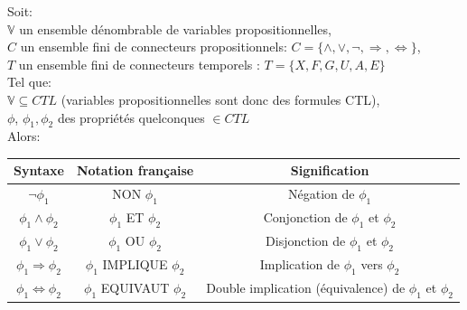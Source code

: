 \documentclass[runningheads,a4paper,10pt]{llncs}
\begin{document}
Soit: \\
$\mathbb{V}$ un ensemble dénombrable de variables propositionnelles, \\
$C$ un ensemble fini de connecteurs propositionnels: $C = \{\wedge, \vee, \neg, \Rightarrow, \Leftrightarrow \}$, \\
$T$ un ensemble fini de connecteurs temporels : $T = \{X, F, G, U, A, E\}$ \\

Tel que:\\
$\mathbb{V} \subseteq CTL$ (variables propositionnelles sont donc des formules CTL), \\
$\phi$, $\phi_{1}, \phi_{2}$ des propriétés quelconques $\in CTL$ \\

Alors: \\

\begin{center}
\begin{tabular}{|c|c|c|}
  \hline
  Syntaxe & Notation française & Signification \\
  \hline
  $\neg\phi_{1}$ & NON $\phi_{1}$ & Négation de $\phi_{1}$ \\
  $\phi_{1} \wedge \phi_{2}$ & $\phi_{1}$ ET $\phi_{2}$ & Conjonction de $\phi_{1}$ et $\phi_{2}$\\
  $\phi_{1} \vee \phi_{2}$ & $\phi_{1}$ OU $\phi_{2}$ & Disjonction de $\phi_{1}$ et $\phi_{2}$\\
  $\phi_{1} \Rightarrow \phi_{2}$ & $\phi_{1}$ IMPLIQUE $\phi_{2}$ & Implication de $\phi_{1}$ vers $\phi_{2}$\\
  $\phi_{1} \Leftrightarrow \phi_{2}$ & $\phi_{1}$ EQUIVAUT $\phi_{2}$ & Double implication (équivalence) de $\phi_{1}$ et $\phi_{2}$\\
 \hline
 
\end{tabular}
 \label{tab:syntax-ctl-prop}
\end{center}
\end{document}
